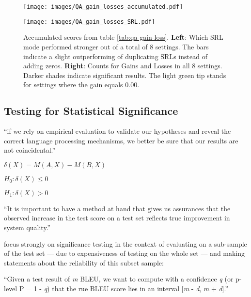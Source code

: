 \begin{figure}
  \begin{minipage}{0.45\linewidth}
  \vspace{0pt}
    \texttt{[image: images/QA\_gain\_losses\_accumulated.pdf]}
  \end{minipage}
  \hfill
  \begin{minipage}{0.45\linewidth}
  \vspace{0pt}
    \texttt{[image: images/QA\_gain\_losses\_SRL.pdf]}
  \end{minipage}
  \caption[Accumulated Gains and Losses.]{Accumulated scores from table \ref{tab:qa-gain-loss}. \textbf{Left}: Which SRL mode performed stronger out of a total of 8 settings. The bars indicate a slight outperforming of duplicating SRLs instead of adding zeros. \textbf{Right}: Counts for Gains and Losses in all 8 settings. Darker shades indicate significant results. The light green tip stands for settings where the gain equals 0.00.}
\end{figure}
\subsection{Testing for Statistical Significance}

``if we rely on empirical evaluation to validate our hypotheses and reveal the correct language processing mechanisms, we better be sure that our results are not coincidental.'' \citep{dror2018hitchhiker}


$\delta(X) = M(A, X) - M(B, X)$

$H_0:\delta(X) \leq 0$

$H_1:\delta(X) > 0$

``It is important to have a method at hand that gives us assurances that the
observed increase in the test score on a test set reflects true improvement in system
quality.'' \citep{koehn2004statistical}

\citet{koehn2004statistical} focus strongly on significance testing in the context of evaluating
on a sub-sample of the test set --- due to expensiveness of testing on the whole set ---
and making statements about the reliability of this subset sample:

``Given a test result of \emph{m} BLEU, we want to compute with a confidence \emph{q} (or
p-level P = 1 - \emph{q}) that the rue BLEU score lies in an interval [\emph{m} - \emph{d},
\emph{m} + \emph{d}].'' \citep{koehn2004statistical}

